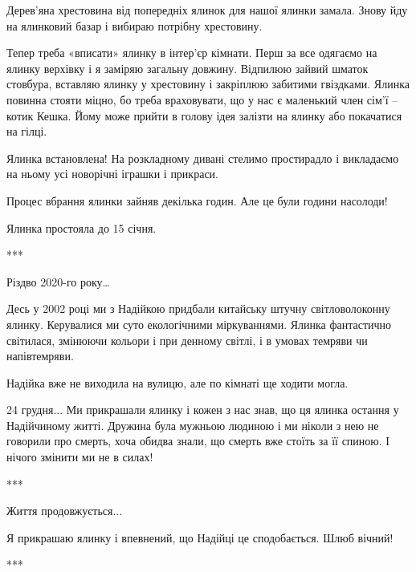 Дерев’яна хрестовина від попередніх ялинок для нашої ялинки замала. Знову йду
на ялинковий базар і вибираю потрібну хрестовину. 

Тепер треба «вписати» ялинку в інтер’єр кімнати. Перш за все одягаємо на ялинку
верхівку і я заміряю загальну довжину. Відпилюю зайвий шматок стовбура,
вставляю ялинку у хрестовину і закріплюю забитими гвіздками. Ялинка повинна
стояти міцно, бо треба враховувати, що у нас є маленький член сім’ї – котик
Кешка. Йому може прийти в голову ідея залізти на ялинку або покачатися на
гілці. 

Ялинка встановлена! На розкладному дивані стелимо простирадло і викладаємо на
ньому усі новорічні іграшки і прикраси. 

Процес вбрання ялинки зайняв декілька годин. Але це були години насолоди!

Ялинка простояла до 15 січня.

***

Різдво 2020-го року…

Десь у 2002 році ми з Надійкою придбали китайську штучну світловолоконну
ялинку. Керувалися ми суто екологічними міркуваннями. Ялинка фантастично
світилася, змінюючи кольори і при денному світлі, і в умовах темряви чи
напівтемряви. 

Надійка вже не виходила на вулицю, але по кімнаті ще ходити могла. 

24 грудня... Ми прикрашали ялинку і кожен з нас знав, що ця ялинка остання у
Надійчиному житті. Дружина була мужньою людиною і ми ніколи з нею не говорили
про смерть, хоча обидва знали, що смерть вже стоїть за її спиною. І нічого
змінити ми не в силах!

***

Життя продовжується... 

Я прикрашаю ялинку і впевнений, що Надійці це сподобається. Шлюб вічний!

***
